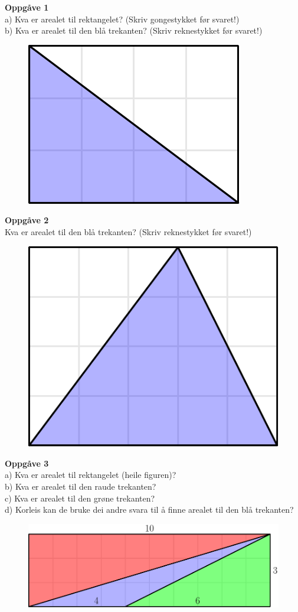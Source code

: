 \documentclass[english,hidelinks,xetex, 11 pt, class=report,crop=false]{standalone}
\begin{document}
\Large
\textbf{Oppgåve 1} \\
a) Kva er arealet til rektangelet? (Skriv gongestykket før svaret!)\\
b) Kva er arealet til den blå trekanten? (Skriv reknestykket før svaret!)
\begin{figure}
	\centering
	\includegraphics[]{artrknt1}
\end{figure}

\textbf{Oppgåve 2}\\
Kva er arealet til den blå trekanten? (Skriv reknestykket før svaret!)
\begin{figure}
	\centering
	\includegraphics[]{artrknt2}
\end{figure}

\textbf{Oppgåve 3}\\
a) Kva er arealet til rektangelet (heile figuren)?\\
b) Kva er arealet til den raude trekanten?\\
c) Kva er arealet til den grøne trekanten?\\
d) Korleis kan de bruke dei andre svara til å finne arealet til den blå trekanten?
\begin{figure}
	\centering
	\includegraphics[]{artrknt3}
\end{figure}
\end{document}
